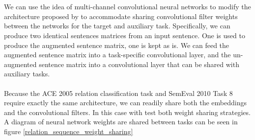 \\\\
We can use the idea of multi-channel convolutional neural networks to modify the architecture proposed by \citet{nguyen2015} to accommodate sharing convolutional filter weights between the networks for the target and auxiliary task. Specifically, we can produce two identical sentences matrices from an input sentence. One is used to produce the augmented sentence matrix, one is kept as is. We can feed the augmented sentence matrix into a task-specific convolutional layer, and the un-augmented sentence matrix into a convolutional layer that can be shared with auxiliary tasks.
\\\\
Because the ACE 2005 relation classification task and SemEval 2010 Task 8 require exactly the same architecture, we can readily share both the embeddings and the convolutional filters. In this case with test both weight sharing strategies. A diagram of neural network weights are shared between tasks can be seen in figure \ref{relation_sequence_weight_sharing}
\newpage
